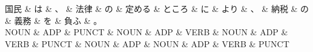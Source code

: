 \documentclass[tikz,border=5pt]{standalone}
\begin{document}
\normalsize
\begin{dependency}[edge unit distance=12.0pt]
    \begin{deptext}[column sep=1em]
        国民 \& は \& 、 \& 法律 \& の \& 定める \& ところ \& に \& より \& 、 \& 納税 \& の \& 義務 \& を \& 負ふ \& 。\\
        NOUN \& ADP \& PUNCT \& NOUN \& ADP \& VERB \& NOUN \& ADP \& VERB \& PUNCT \& NOUN \& ADP \& NOUN \& ADP \& VERB \& PUNCT\\
    \end{deptext}
\end{dependency}
\end{document}
